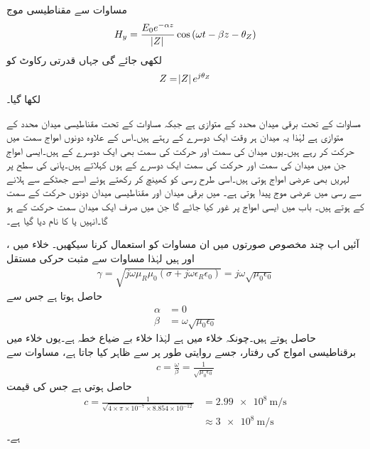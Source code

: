 مساوات  سے مقناطیسی موج
\begin{align}\label{مساوات_موج_عمومی_مقناطیسی}
H_y=\frac{E_0 e^{-\alpha z}}{\abs{Z}} \cos \left(\omega t - \beta z -\theta_{Z} \right)
\end{align}
لکھی جائے گی جہاں قدرتی رکاوٹ کو
\begin{align}
Z=\abs{Z} e^{j \theta_{Z}}
\end{align}
لکھا گیا۔

مساوات  کے تحت برقی میدان  محدد کے متوازی ہے جبکہ مساوات  کے تحت مقناطیسی میدان  محدد کے متوازی ہے لہٰذا یہ میدان   ہر وقت ایک دوسرے کے    رہتے ہیں۔اس کے علاوہ دونوں امواج  سمت میں حرکت کر رہے ہیں۔یوں میدان کی سمت اور حرکت کی سمت بھی ایک دوسرے کے    ہیں۔ایسی امواج جن میں میدان کی سمت اور حرکت کی سمت ایک دوسرے کے    ہوں  کہلاتے ہیں۔پانی کی سطح پر لہریں بھی عرضی امواج ہوتی ہیں۔اسی طرح رسی کو کھینچ کر رکھتے ہوئے اسے جھٹکے  سے ہلانے سے  رسی میں عرضی موج پیدا ہوتی ہے۔ میں برقی میدان اور مقناطیسی میدان دونوں حرکت کے سمت کے   ہوتے ہیں۔ باب  میں ایسی امواج پر غور کیا جائے گا جن میں صرف ایک میدان سمت حرکت کے  ہو گا۔انہیں  یا  کا نام دیا گیا ہے۔ 

آئیں اب چند مخصوص صورتوں میں ان مساوات کو استعمال کرنا سیکھیں۔
خلاء میں ،  اور   ہیں لہٰذا مساوات  سے مثبت حرکی مستقل
\begin{align*}
\gamma=\sqrt{j \omega \mu_R \mu_0  \left(\sigma +j \omega \epsilon_R \epsilon_0 \right)}=j \omega \sqrt{\mu_0 \epsilon_0}
\end{align*}
حاصل ہوتا ہے جس سے
\begin{align*}
\alpha&=0\\
\beta&=\omega \sqrt{\mu_0 \epsilon_0}
\end{align*}
حاصل ہوتے ہیں۔چونکہ خلاء میں   ہے لہٰذا خلاء بے ضیاع خطہ ہے۔یوں خلاء میں برقناطیسی امواج کی رفتار، جسے روایتی طور پر  سے ظاہر کیا جاتا ہے،  مساوات  سے
\begin{align}
c=\frac{\omega}{\beta}=\frac{1}{\sqrt{\mu_0 \epsilon_0}}
\end{align}
حاصل ہوتی ہے جس کی قیمت
\begin{align*}
c=\frac{1}{\sqrt{4 \times \pi \times 10^{-7} \times 8.854 \times 10^{-12}}}&=\SI{2.99e8}{\meter \per \second} \\
&\approx \SI{3e8}{\meter \per \second}
\end{align*}
ہے۔

